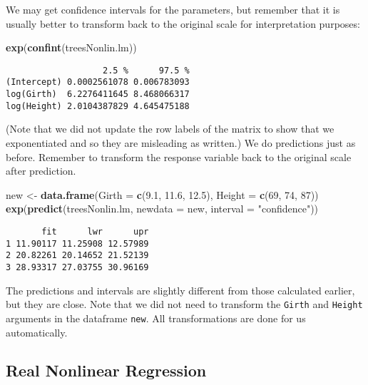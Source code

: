 \documentclass[]{book}
\newenvironment{Shaded}{\begin{snugshade}}{\end{snugshade}}
\newcommand{\KeywordTok}[1]{\textcolor[rgb]{0.13,0.29,0.53}{\textbf{{#1}}}}
\newcommand{\DataTypeTok}[1]{\textcolor[rgb]{0.13,0.29,0.53}{{#1}}}
\newcommand{\DecValTok}[1]{\textcolor[rgb]{0.00,0.00,0.81}{{#1}}}
\newcommand{\FloatTok}[1]{\textcolor[rgb]{0.00,0.00,0.81}{{#1}}}
\newcommand{\StringTok}[1]{\textcolor[rgb]{0.31,0.60,0.02}{{#1}}}
\newcommand{\NormalTok}[1]{{#1}}
\numberwithin{equation}{chapter}
\numberwithin{figure}{chapter}
\theoremstyle{plain}
\theoremstyle{definition}
\theoremstyle{remark}
\theoremstyle{definition}
\theoremstyle{definition}
\theoremstyle{remark}
\begin{document}
We may get confidence intervals for the parameters, but remember that it
is usually better to transform back to the original scale for
interpretation purposes:

\begin{Shaded}
\begin{Highlighting}[]
\KeywordTok{exp}\NormalTok{(}\KeywordTok{confint}\NormalTok{(treesNonlin.lm))}
\end{Highlighting}
\end{Shaded}

\begin{verbatim}
                   2.5 %      97.5 %
(Intercept) 0.0002561078 0.006783093
log(Girth)  6.2276411645 8.468066317
log(Height) 2.0104387829 4.645475188
\end{verbatim}

(Note that we did not update the row labels of the matrix to show that
we exponentiated and so they are misleading as written.) We do
predictions just as before. Remember to transform the response variable
back to the original scale after prediction.

\begin{Shaded}
\begin{Highlighting}[]
\NormalTok{new <-}\StringTok{ }\KeywordTok{data.frame}\NormalTok{(}\DataTypeTok{Girth =} \KeywordTok{c}\NormalTok{(}\FloatTok{9.1}\NormalTok{, }\FloatTok{11.6}\NormalTok{, }\FloatTok{12.5}\NormalTok{), }
                  \DataTypeTok{Height =} \KeywordTok{c}\NormalTok{(}\DecValTok{69}\NormalTok{, }\DecValTok{74}\NormalTok{, }\DecValTok{87}\NormalTok{))}
\KeywordTok{exp}\NormalTok{(}\KeywordTok{predict}\NormalTok{(treesNonlin.lm, }\DataTypeTok{newdata =} \NormalTok{new, }
            \DataTypeTok{interval =} \StringTok{"confidence"}\NormalTok{))}
\end{Highlighting}
\end{Shaded}

\begin{verbatim}
       fit      lwr      upr
1 11.90117 11.25908 12.57989
2 20.82261 20.14652 21.52139
3 28.93317 27.03755 30.96169
\end{verbatim}

The predictions and intervals are slightly different from those
calculated earlier, but they are close. Note that we did not need to
transform the \texttt{Girth} and \texttt{Height} arguments in the
dataframe \texttt{new}. All transformations are done for us
automatically.

\subsection{Real Nonlinear Regression}\label{real-nonlinear-regression}
\end{document}
